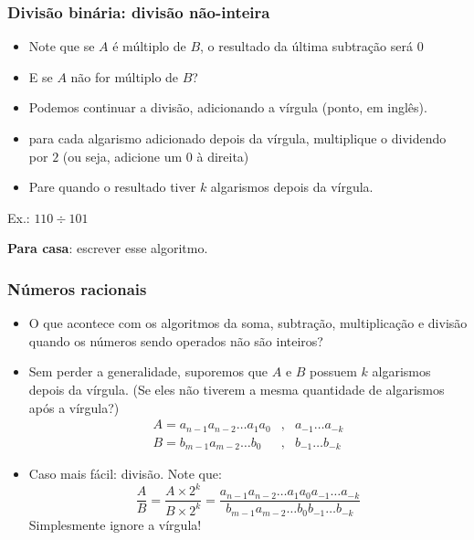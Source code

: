 \documentclass{beamer}
\begin{document}

\begin{frame}[fragile]
\frametitle{Divisão binária: divisão não-inteira}

\begin{itemize}
\item Note que se $A$ é múltiplo de $B$, o resultado da última subtração será $0$
\pause
\item E se $A$ não for múltiplo de $B$?
\pause
\item Podemos continuar a divisão, adicionando a vírgula (ponto, em inglês).
\pause
\item para cada algarismo adicionado depois da vírgula, multiplique o dividendo por $2$ (ou seja, adicione um $0$ à direita)
\pause
\item Pare quando o resultado tiver $k$ algarismos depois da vírgula.
\end{itemize}

Ex.: $110 \div 101$\\[12pt]

\pause

\textbf{Para casa}: escrever esse algoritmo.
\end{frame}

\begin{frame}
\frametitle{Números racionais}

\begin{itemize}
\item O que acontece com os algoritmos da soma, subtração, multiplicação e divisão quando os números sendo operados não são inteiros?
\pause
\item Sem perder a generalidade, suporemos que $A$ e $B$ possuem $k$ algarismos depois da vírgula. (Se eles não tiverem a mesma quantidade de algarismos após a vírgula?)
\begin{eqnarray*}
A = a_{n-1} a_{n-2} \ldots a_1 a_0 & , & a_{-1} \ldots a_{-k} \\
B = b_{m-1} a_{m-2} \ldots b_0 & , & b_{-1} \ldots b_{-k}
\end{eqnarray*}
\vspace{-12pt}
\pause
\item Caso mais fácil: divisão. Note que:
$$
\frac{A}{B} = \frac{A \times 2^k}{B \times 2^k} = \frac{a_{n-1} a_{n-2} \ldots a_1 a_0 a_{-1} \ldots a_{-k}}{b_{m-1} a_{m-2} \ldots b_0 b_{-1} \ldots b_{-k}}
$$
\vspace{-12pt}
\pause
Simplesmente ignore a vírgula!
\end{itemize}

\end{frame}
\end{document}
